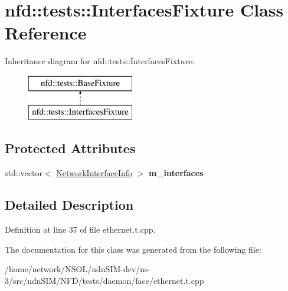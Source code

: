 \hypertarget{classnfd_1_1tests_1_1InterfacesFixture}{}\section{nfd\+:\+:tests\+:\+:Interfaces\+Fixture Class Reference}
\label{classnfd_1_1tests_1_1InterfacesFixture}
Inheritance diagram for nfd\+:\+:tests\+:\+:Interfaces\+Fixture\+:\begin{figure}[H]
\begin{center}
\leavevmode
\includegraphics[height=2.000000cm]{classnfd_1_1tests_1_1InterfacesFixture}
\end{center}
\end{figure}
\subsection*{Protected Attributes}
\begin{DoxyCompactItemize}
\item 
std\+::vector$<$ \hyperlink{classnfd_1_1NetworkInterfaceInfo}{Network\+Interface\+Info} $>$ {\bfseries m\+\_\+interfaces}\hypertarget{classnfd_1_1tests_1_1InterfacesFixture_a74ace5b7941e52a7869b5e90c79b15ae}{}\label{classnfd_1_1tests_1_1InterfacesFixture_a74ace5b7941e52a7869b5e90c79b15ae}

\end{DoxyCompactItemize}


\subsection{Detailed Description}


Definition at line 37 of file ethernet.\+t.\+cpp.



The documentation for this class was generated from the following file\+:\begin{DoxyCompactItemize}
\item 
/home/network/\+N\+S\+O\+L/ndn\+S\+I\+M-\/dev/ns-\/3/src/ndn\+S\+I\+M/\+N\+F\+D/tests/daemon/face/ethernet.\+t.\+cpp\end{DoxyCompactItemize}
